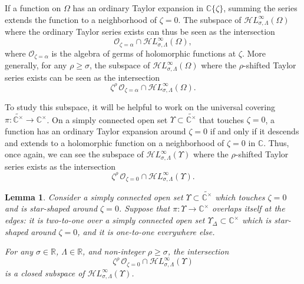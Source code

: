 \documentclass{article}
\newcommand{\singexp}[2]{\mathcal{H}L^\infty_{#1, #2}}
\newcommand{\maps}{\colon}
\newcommand{\R}{\mathbb{R}}
\newcommand{\C}{\mathbb{C}}
\theoremstyle{definition}
\theoremstyle{plain}
\newtheorem{lemma}[definition]{Lemma}
\begin{document}
If a function on $\Omega$ has an ordinary Taylor expansion in $\C\{\zeta\}$, summing the series extends the function to a neighborhood of $\zeta = 0$. The subspace of $\singexp{\sigma}{\Lambda}(\Omega)$ where the ordinary Taylor series exists can thus be seen as the intersection
\[ \mathcal{O}_{\zeta = \alpha} \cap \singexp{\sigma}{\Lambda}(\Omega), \]
where $\mathcal{O}_{\zeta = \alpha}$ is the algebra of germs of holomorphic functions at $\zeta$. More generally, for any $\rho \ge \sigma$, the subspace of $\singexp{\sigma}{\Lambda}(\Omega)$ where the $\rho$-shifted Taylor series exists can be seen as the intersection
\[ \zeta^\rho\,\mathcal{O}_{\zeta = \alpha} \cap \singexp{\sigma}{\Lambda}(\Omega). \]

To study this subspace, it will be helpful to work on the universal covering $\pi \maps \widetilde{\C^\times} \to \C^\times$. On a simply connected open set $\Upsilon \subset \widetilde{\C^\times}$ that touches $\zeta = 0$, a function has an ordinary Taylor expansion around $\zeta = 0$ if and only if it descends and extends to a holomorphic function on a neighborhood of $\zeta = 0$ in $\C$. Thus, once again, we can see the subspace of $\singexp{\sigma}{\Lambda}(\Upsilon)$ where the $\rho$-shifted Taylor series exists as the intersection
\[ \zeta^\rho\,\mathcal{O}_{\zeta = 0} \cap \singexp{\sigma}{\Lambda}(\Upsilon). \]
\begin{lemma}\label{lem:shifted_holo_closed}
Consider a simply connected open set $\Upsilon \subset \widetilde{\C^\times}$ which touches $\zeta = 0$ and is star-shaped around $\zeta = 0$. Suppose that $\pi \maps \Upsilon \to \C^\times$ overlaps itself at the edges: it is two-to-one over a simply connected open set $\Upsilon_\Delta \subset \C^\times$ which is star-shaped around $\zeta = 0$, and it is one-to-one everywhere else.
\begin{center}
\label{fig:domain_Upsilon}
\end{center}
For any $\sigma \in \R$, $\Lambda \in \R$, and non-integer $\rho \ge \sigma$, the intersection
\[ \zeta^\rho\,\mathcal{O}_{\zeta = 0} \cap \singexp{\sigma}{\Lambda}(\Upsilon) \]
is a closed subspace of $\singexp{\sigma}{\Lambda}(\Upsilon)$.
\end{lemma}
\end{document}

